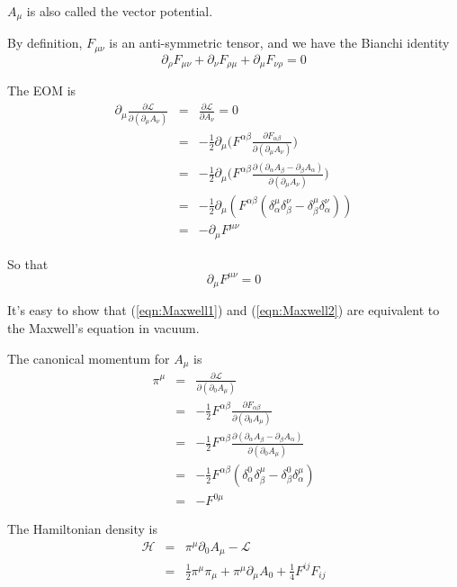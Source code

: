 \documentclass[12pt]{book}
\begin{document}
	$A_\mu$ is also called the vector potential.

	By definition, $F_{\mu\nu}$ is an anti-symmetric tensor, and we have the Bianchi identity
	\begin{equation}
		\partial_\rho F_{\mu\nu}+\partial_\nu F_{\rho\mu}+\partial_\mu F_{\nu\rho}=0 \label{eqn:Maxwell1}
	\end{equation}
	
	The EOM is
	\begin{eqnarray}
		\partial_\mu\frac{\partial\mathcal L}{\partial(\partial_\mu A_\nu)}&=&\frac{\partial \mathcal L}{\partial A_\nu}=0\\
		&=&-\frac 12 \partial_\mu\Big(F^{\alpha\beta}\frac{\partial F_{\alpha\beta}}{\partial(\partial_\mu A_\nu)}\Big)\\
		&=&-\frac 12 \partial_\mu\Big(F^{\alpha\beta}\frac{\partial(\partial_\alpha A_\beta-\partial_\beta A_\alpha)}{\partial(\partial_\mu A_\nu)}\Big)\\
		&=&-\frac 12 \partial_\mu(F^{\alpha\beta}(\delta^\mu_\alpha\delta^\nu_\beta-\delta^\mu_\beta\delta^\nu_\alpha))\\
		&=&-\partial_\mu F^{\mu\nu}
	\end{eqnarray}
	
	So that
	\begin{equation}
		\partial_\mu F^{\mu\nu}=0	\label{eqn:Maxwell2}
	\end{equation}
	
	
	It's easy to show that (\ref{eqn:Maxwell1}) and (\ref{eqn:Maxwell2}) are equivalent to the Maxwell's equation in vacuum.
	


	The canonical momentum for $A_\mu$ is
	\begin{eqnarray}
		\pi^\mu&=&\frac{\partial\mathcal L}{\partial(\partial_0 A_\mu)}\\
		&=&-\frac 12 F^{\alpha\beta}\frac{\partial F_{\alpha\beta}}{\partial(\partial_0 A_\mu)}\\
		&=&-\frac 12 F^{\alpha\beta}\frac{\partial (\partial_\alpha A_\beta-\partial_\beta A_\alpha)}{\partial(\partial_0 A_\mu)}\\
		&=&-\frac 12 F^{\alpha\beta}(\delta^0_\alpha\delta^\mu_\beta-\delta^0_\beta\delta^\mu_\alpha)\\
		&=&-F^{0\mu}
	\end{eqnarray}
	
	The Hamiltonian density is
	\begin{eqnarray}
		\mathcal H&=&\pi^\mu\partial_0 A_\mu-\mathcal L\\
		&=&\frac 12 \pi^\mu\pi_\mu+\pi^\mu\partial_\mu A_0 +\frac 14 F^{ij}F_{ij}
	\end{eqnarray}
	
\end{document}
